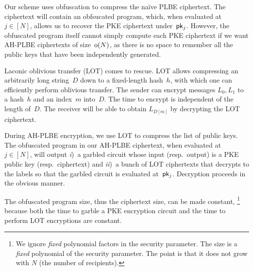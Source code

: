 Our scheme uses obfuscation to compress the na{\"i}ve PLBE ciphertext.
The ciphertext will contain an obfsucated program, which, when evaluated at~${j\in[N]}$, allows us to recover the PKE ciphertext under~$\pk_j$.
However, the obfuscated program itself cannot simply compute each PKE ciphertext if we want AH-PLBE ciphertexts of size~$\operatorname{o}(N)$, as there is no space to remember all the public keys that have been independently generated.

Laconic oblivious transfer (LOT) comes to rescue.
LOT allows compressing an arbitrarily long string~$D$ down to a fixed-length hash~$h$, with which one can efficiently perform oblivious transfer.
The sender can encrypt messages $L_0,L_1$ to a hash~$h$ and an index~$m$ into~$D$.
The time to encrypt is independent of the length of~$D$.
The receiver will be able to obtain $L_{D[m]}$ by decrypting the LOT ciphertext.

During AH-PLBE encryption, we use LOT to compress the list of public keys.
The obfuscated program in our AH-PLBE ciphertext, when evaluated at~${j\in[N]}$, will output
\emph{i})~a garbled circuit whose input (resp.~output) is a PKE public key (resp.~ciphertext) and
\emph{ii})~a bunch of LOT ciphertexts that decrypts to the labels so that the garbled circuit is evaluated at~$\pk_j$.
Decryption proceeds in the obvious manner.

The obfuscated program size, thus the ciphertext size, can be made constant,%
\footnote{We ignore \emph{fixed} polynomial factors in the security parameter.
The size is a \emph{fixed} polynomial of the security parameter.
The point is that it does not grow with $N$ (the number of recipients).}
because
both the time to garble a PKE encryption circuit and the time to perform LOT encryptions are constant.
